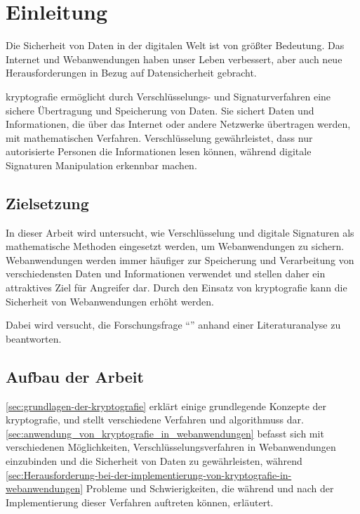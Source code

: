 \section{Einleitung}\label{sec:einleitung}
Die Sicherheit von Daten in der digitalen Welt ist von größter Bedeutung.
Das Internet und Webanwendungen haben unser Leben verbessert, aber auch neue Herausforderungen in Bezug auf Datensicherheit gebracht.

\Gls{kryptografie} ermöglicht durch Verschlüsselungs- und Signaturverfahren eine sichere Übertragung und Speicherung von Daten.
Sie sichert Daten und Informationen, die über das Internet oder andere Netzwerke übertragen werden, mit mathematischen Verfahren. 
Verschlüsselung gewährleistet, dass nur autorisierte Personen die Informationen lesen können, während digitale Signaturen Manipulation erkennbar machen.


\subsection{Zielsetzung}\label{subsec:zielsetzung}
In dieser Arbeit wird untersucht, wie Verschlüsselung und digitale Signaturen als mathematische Methoden eingesetzt werden, um Webanwendungen zu sichern.
Webanwendungen werden immer häufiger zur Speicherung und Verarbeitung von verschiedensten Daten und Informationen verwendet und stellen daher ein attraktives Ziel für Angreifer dar.
Durch den Einsatz von \gls{kryptografie} kann die Sicherheit von Webanwendungen erhöht werden.

Dabei wird versucht, die Forschungsfrage \enquote{\myForschungsfrage} anhand einer Literaturanalyse zu beantworten.


\subsection{Aufbau der Arbeit}\label{subsec:aufbau-der-arbeit}
\autoref{sec:grundlagen-der-kryptografie} erklärt einige grundlegende Konzepte der \gls{kryptografie}, und stellt verschiedene  Verfahren und \glspl{algorithmus} dar.
\autoref{sec:anwendung_von_kryptografie_in_webanwendungen} befasst sich mit verschiedenen Möglichkeiten, Verschlüsselungsverfahren in Webanwendungen einzubinden und die Sicherheit von Daten zu gewährleisten, während  \autoref{sec:Herausforderung-bei-der-implementierung-von-kryptografie-in-webanwendungen} Probleme und Schwierigkeiten, die während und nach der Implementierung dieser Verfahren auftreten können, erläutert.